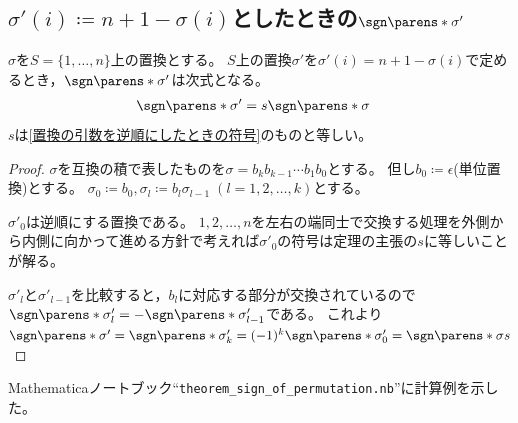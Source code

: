         \subsection{\texorpdfstring{$\sigma'(i) \coloneq n+1-\sigma(i)$としたときの$\sgn\parens*{\sigma'}$}{σ'(i) := n+1-σ(i)としたときのsgn(σ')}}
            \label{出力を逆順にしたときの置換の符号}
            \begin{shadebox}
                $\sigma$を$S=\{1,\dotsc,n\}$上の置換とする。
                $S$上の置換$\sigma'$を$\sigma'(i) = n+1-\sigma(i)$で定めるとき，$\sgn\parens*{\sigma'}$は次式となる。
                \begin{align*}
                    \sgn\parens*{\sigma'} &= s\sgn\parens*{\sigma}
                \end{align*}
                $s$は\ref{置換の引数を逆順にしたときの符号}のものと等しい。
            \end{shadebox}
            \begin{proof}
                $\sigma$を互換の積で表したものを$\sigma=b_k b_{k-1}\dotsm b_1 b_0$とする。
                但し$b_0 \coloneq \epsilon$(単位置換)とする。
                $\sigma_0 \coloneq b_0,\sigma_l \coloneq b_l\sigma_{l-1}\;(l=1,2,\dotsc,k)$とする。
                \par
                $\sigma'_0$は逆順にする置換である。
                $1,2,\dotsc,n$を左右の端同士で交換する処理を外側から内側に向かって進める方針で考えれば$\sigma'_0$の符号は定理の主張の$s$に等しいことが解る。
                \par
                $\sigma'_l$と$\sigma'_{l-1}$を比較すると，$b_l$に対応する部分が交換されているので$\sgn\parens*{\sigma'_l} = -\sgn\parens*{\sigma'_{l-1}}$である。
                これより$\sgn\parens*{\sigma'} = \sgn\parens*{\sigma'_k} = (-1)^k\sgn\parens*{\sigma'_0} = \sgn\parens*{\sigma} s$
            \end{proof}
            Mathematicaノートブック``\nolinkurl{theorem_sign_of_permutation.nb}''に計算例を示した。
